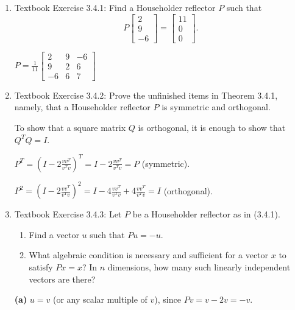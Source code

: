\documentclass[reqno, answers]{exam}
\begin{document}
\begin{enumerate}
\begin{solution}
$A^+ A = (A^T A)^{-1} A^T A = (A^T A)^{-1} (A^T A) = I_n$
\end{solution}

\item Textbook Exercise 3.4.1: Find a Householder reflector $P$ such that
\[
P \begin{bmatrix} 2 \\ 9 \\ -6 \end{bmatrix} = \begin{bmatrix} 11 \\ 0 \\ 0 \end{bmatrix}.
\]

\begin{solution}
$P = \frac{1}{11} \begin{bmatrix} 2 & 9 & -6 \\ 9 & 2 & 6 \\ -6 & 6 & 7 \end{bmatrix}$
\end{solution}

\item Textbook Exercise 3.4.2: Prove the unfinished items in Theorem 3.4.1, namely, that a Householder reflector $P$ is symmetric and orthogonal.

To show that a square matrix $Q$ is orthogonal, it is enough to show that $Q^T Q = I$.

\begin{solution}
$P^T = (I - 2\frac{vv^T}{v^T v})^T = I - 2\frac{vv^T}{v^T v} = P$ (symmetric). 

$P^2 = (I - 2\frac{vv^T}{v^T v})^2 = I - 4\frac{vv^T}{v^T v} + 4\frac{vv^T}{v^T v} = I$ (orthogonal).
\end{solution}

\item Textbook Exercise 3.4.3: Let $P$ be a Householder reflector as in (3.4.1).
\begin{enumerate}
\item[(a)] Find a vector $u$ such that $Pu = -u$.
\item[(b)] What algebraic condition is necessary and sufficient for a vector $x$ to satisfy $Px = x$? In $n$ dimensions, how many such linearly independent vectors are there?
\end{enumerate}

\begin{solution}
\textbf{(a)} $u = v$ (or any scalar multiple of $v$), since $Pv = v - 2v = -v$.


\end{solution}
\end{enumerate}
\end{document}

